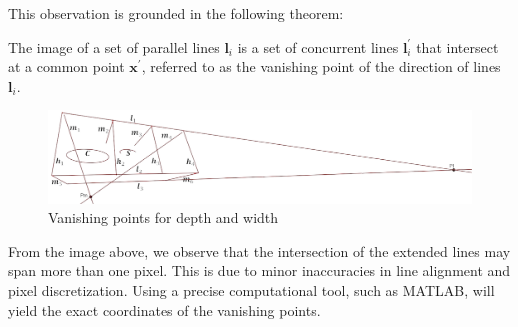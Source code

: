 This observation is grounded in the following theorem:
\begin{theorem}
    The image of a set of parallel lines $\mathbf{l}_i$ is a set of concurrent lines $\mathbf{l}^\prime_i$ that intersect at a common point $\mathbf{x}^\prime$, referred to as the vanishing point of the direction of lines $\mathbf{l}_i$. 
\end{theorem}
\begin{figure}[H]
    \centering
    \includegraphics[width=0.75\linewidth]{images/vanishing point.png}
    \caption{Vanishing points for depth and width}
\end{figure}
From the image above, we observe that the intersection of the extended lines may span more than one pixel. 
This is due to minor inaccuracies in line alignment and pixel discretization.
Using a precise computational tool, such as MATLAB, will yield the exact coordinates of the vanishing points.

